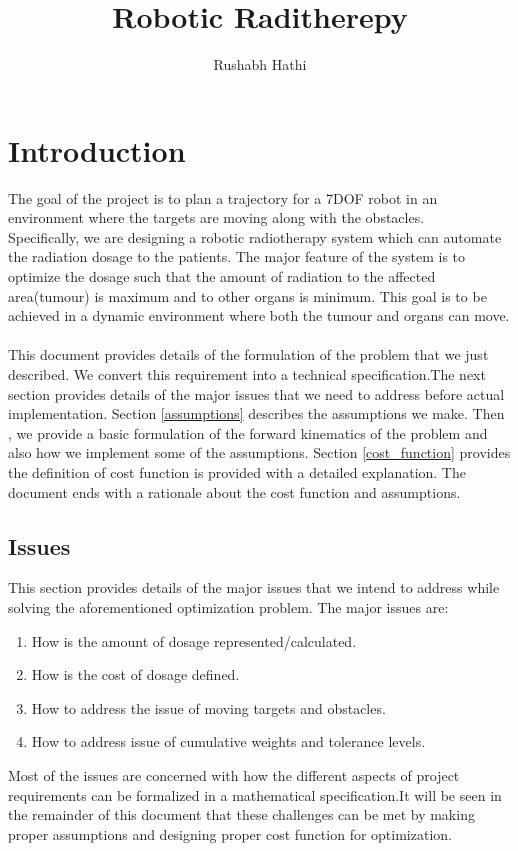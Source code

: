 \documentclass[10pt]{report}
\title{Robotic Raditherepy}
\author{Rushabh Hathi}
\begin{document}
\maketitle
\chapter{Introduction}
The goal of the project is to plan a trajectory for a 7DOF robot in an environment where the targets are moving along with the obstacles. 
\\
Specifically, we are designing a robotic radiotherapy system which can automate the radiation dosage to the patients. The major feature of the system is to optimize the dosage such that the amount of radiation to the affected area(tumour) is maximum and to other organs is minimum. This goal is to be achieved in a dynamic environment where both the tumour and organs can move. 
\\
\\
This document provides details of the formulation of the problem that we just described. We convert this requirement into a technical specification.The next section provides details of the major issues that we need to address before actual implementation. Section \ref{assumptions} describes the assumptions we make. Then , we provide a basic formulation of the forward kinematics of the problem and also how we implement some of the assumptions. Section \ref{cost_function} provides the definition of cost function is provided with a detailed explanation. The document ends with a rationale about the cost function and assumptions.
\section{Issues}
This section provides details of the major issues that we intend to address while solving the aforementioned optimization problem. 
The major issues are:
\begin{enumerate}
\item How is the amount of dosage represented/calculated.
\item How is the cost of dosage defined.
\item How to address the issue of moving targets and obstacles.
\item How to address issue of cumulative weights and tolerance levels.
\end{enumerate}
Most of the issues are concerned with how the different aspects of project requirements can be formalized in a mathematical specification.It will be seen in the remainder of this document that these challenges can be met by making proper assumptions and designing proper cost function for optimization.
\end{document}
